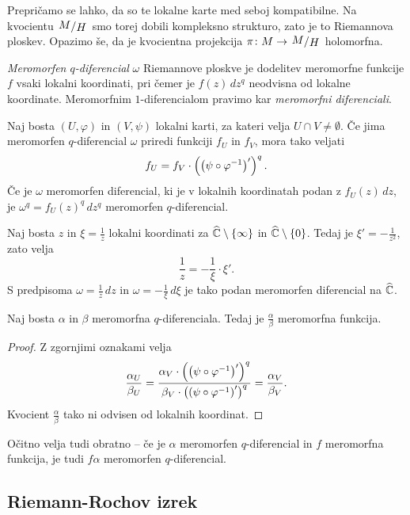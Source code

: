 Prepričamo se lahko, da so te lokalne karte med seboj kompatibilne.
Na kvocientu $\kvoc{M}{H}$ smo torej dobili kompleksno strukturo,
zato je to Riemannova ploskev. Opazimo še, da je kvocientna
projekcija $\pi \colon M \to \kvoc{M}{H}$ holomorfna.

\begin{definicija}
\emph{Meromorfen $q$-diferencial} $\omega$ Riemannove ploskve je
dodelitev meromorfne funkcije $f$ vsaki lokalni koordinati, pri
čemer je $f(z)\,dz^q$ neodvisna od lokalne koordinate. Meromorfnim
$1$-diferencialom pravimo kar \emph{meromorfni diferenciali}.
\end{definicija}

Naj bosta $(U, \varphi)$ in $(V, \psi)$ lokalni karti, za kateri
velja $U \cap V \ne \emptyset$. Če jima meromorfen $q$-diferencial
$\omega$ priredi funkciji $f_U$ in $f_V$, mora tako veljati
\[
f_U = f_V \cdot \left(\left(\psi \circ \varphi^{-1}\right)'\right)^q.
\]
Če je $\omega$ meromorfen diferencial, ki je v lokalnih koordinatah
podan z $f_U(z)\,dz$, je $\omega^q = f_U(z)^q\,dz^q$ meromorfen
$q$-diferencial.

\begin{zgled}
Naj bosta $z$ in $\xi = \frac{1}{z}$ lokalni koordinati za
$\widehat{\mathbb{C}} \setminus \left\{\infty\right\}$ in $\widehat{\mathbb{C}} \setminus \left\{0\right\}$. Tedaj je
$\xi' = -\frac{1}{z^2}$, zato velja
\[
\frac{1}{z} = -\frac{1}{\xi} \cdot \xi'.
\]
S predpisoma $\omega = \frac{1}{z}\,dz$ in
$\omega = -\frac{1}{\xi}\,d\xi$ je tako podan meromorfen
diferencial na $\widehat{\mathbb{C}}$.
\end{zgled}

\begin{trditev}
Naj bosta $\alpha$ in $\beta$ meromorfna $q$-diferenciala. Tedaj je
$\frac{\alpha}{\beta}$ meromorfna funkcija.
\end{trditev}

\begin{proof}
Z zgornjimi oznakami velja
\[
\frac{\alpha_U}{\beta_U} =
\frac{\alpha_V \cdot \left(\left(\psi \circ \varphi^{-1}\right)'\right)^q}
{\beta_V \cdot \left(\left(\psi \circ \varphi^{-1}\right)'\right)^q} =
\frac{\alpha_V}{\beta_V}.
\]
Kvocient $\frac{\alpha}{\beta}$ tako ni odvisen od lokalnih
koordinat.
\end{proof}

Očitno velja tudi obratno -- če je $\alpha$ meromorfen
$q$-diferencial in $f$ meromorfna funkcija, je tudi $f \alpha$
meromorfen $q$-diferencial.

\subsection{Riemann-Rochov izrek}

